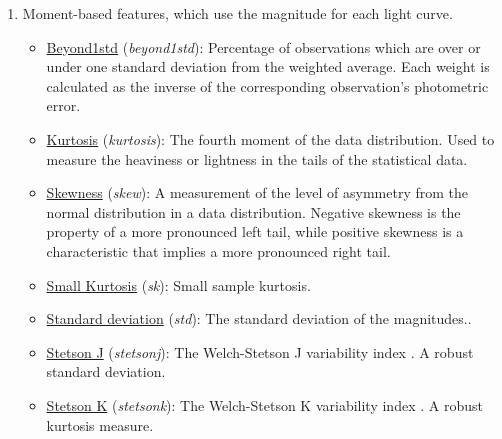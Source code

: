 \documentclass[a4paper,fleqn,usenatbib]{mnras}
\begin{document}
\begin{enumerate}
    
\item Moment-based features, which use the magnitude for each light curve.
  \begin{itemize}
  \item \underline{Beyond1std} (\textit{beyond1std}): 
    Percentage of observations which are over or under one standard
    deviation from the weighted average. Each weight is calculated as
    the inverse of the corresponding observation's photometric error. 
        \item \underline{Kurtosis} (\textit{kurtosis}): 
        The fourth moment of the data distribution. Used to measure
        the heaviness or lightness in the tails of the statistical
        data. 
        \item \underline{Skewness} (\textit{skew}): 
        A measurement of the level of asymmetry from the normal
        distribution in a data distribution. Negative skewness is the
        property of a more pronounced left tail, while positive
        skewness is a characteristic that implies a more pronounced
        right tail. 
        \item \underline{Small Kurtosis} (\textit{sk}):
        Small sample kurtosis.
        \item \underline{Standard deviation} (\textit{std}):
        The standard deviation of the magnitudes..
        \item \underline{Stetson J} (\textit{stetson\textunderscore j}):
        The Welch-Stetson J variability index
        \cite{1996PASP..108..851S}. A robust standard deviation. 
        \item \underline{Stetson K} (\textit{stetson\textunderscore k}): 
        The Welch-Stetson K variability index
        \cite{1996PASP..108..851S}. A robust kurtosis measure. 
    \end{itemize}
    

\end{enumerate}
\end{document}
